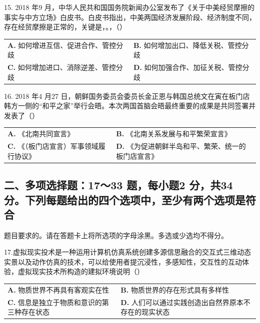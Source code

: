 \documentclass[UTF8,11pt]{ctexart}
\begin{document}
15. 2018 年9 月，中华人民共和国国务院新闻办公室发布了《关于中美经贸摩擦的事实与中方立场》白皮书。白皮书指出，中美两国经济发展阶段、经济制度不同，存在经贸摩擦是正常的，关键是，。，（）


\begin{center}\begin{tabular}{>{\raggedright\arraybackslash}p{\dimexpr(\linewidth-4\tabcolsep)/2\relax}>{\raggedright\arraybackslash}p{\dimexpr(\linewidth-4\tabcolsep)/2\relax}}
\textbf{A.} 如何增进互信、促进合作、管控分歧 & \textbf{B.} 如何增加出口、降低关税、管控分歧\\[.35em]
\textbf{C.} 如何增加进口、消除逆差、管控分歧 & \textbf{D.} 如何加强合作、加征关税、管控分歧\\[.35em]\end{tabular}\end{center}

16. 2018 年4 月27 日，朝鲜国务委员会委员长金正恩与韩国总统文在寅在板门店韩方一侧的“和平之家”举行会晤。本次两国首脑会晤最终重要的成果是共同签署并发表了（）


\begin{center}\begin{tabular}{>{\raggedright\arraybackslash}p{\dimexpr(\linewidth-4\tabcolsep)/2\relax}>{\raggedright\arraybackslash}p{\dimexpr(\linewidth-4\tabcolsep)/2\relax}}
\textbf{A.} 《北南共同宣言》 & \textbf{B.} 《北南关系发展与和平繁荣宣言》\\[.35em]
\textbf{C.} 《（板门店宣言）军事领域履行协议》 & \textbf{D.} 《为促进朝鲜半岛和平、繁荣、统一的板门店宣言》\\[.35em]\end{tabular}\end{center}

\subsection*{二、多项选择题：17～33 题，每小题2 分，共34 分。下列每题给出的四个选项中，至少有两个选项是符合}

题目要求的。请在答题卡上将所选项的字母涂黑。多选或少选均不得分。


17.虚拟现实投术是一种运用计算机仿真系统创建多源信思融合的交互式三维动态实景以及动作仿真的技术，可以给使用者提沉浸性，多感知性，交互性的互动体验，虚拟现实技术所构造的建拟环境说明（）


\begin{center}\begin{tabular}{>{\raggedright\arraybackslash}p{\dimexpr(\linewidth-4\tabcolsep)/2\relax}>{\raggedright\arraybackslash}p{\dimexpr(\linewidth-4\tabcolsep)/2\relax}}
\textbf{A.} 物质世界不再具有客观实在性 & \textbf{B.} 物质世界的存在形式具有多样性\\[.35em]
\textbf{C.} 信息是独立于物质和意识的第三种存在状态 & \textbf{D.} 人们可以通过实践创造出自然界原本不存在的现实状态\\[.35em]\end{tabular}\end{center}
\end{document}
